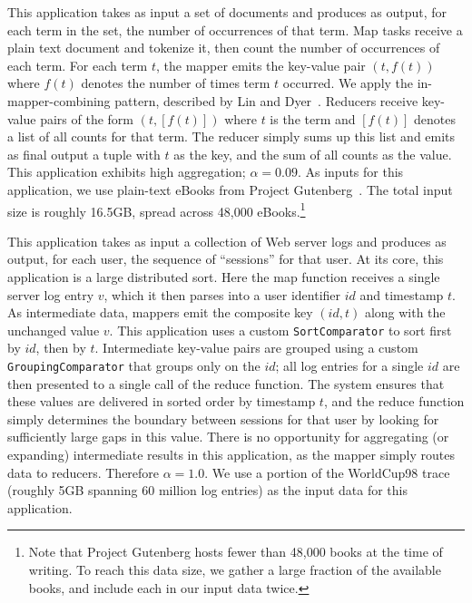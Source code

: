  This application takes as input a set of
documents and produces as output, for each term in the set, the number of
occurrences of that term.
Map tasks receive a plain text document and tokenize it, then count the number
of occurrences of each term.
For each term $t$, the mapper emits the key-value pair $(t, f(t))$ where $f(t)$
denotes the number of times term $t$ occurred.
We apply the in-mapper-combining pattern, described by Lin and
Dyer~\cite{lin2010ditp}.
Reducers receive key-value pairs of the form $(t, [f(t)])$ where $t$ is the
term and $[f(t)]$ denotes a list of all counts for that term.
The reducer simply sums up this list and emits as final output a tuple with $t$
as the key, and the sum of all counts as the value.
This application exhibits high aggregation; $\alpha=0.09$.
As inputs for this application, we use plain-text eBooks from Project
Gutenberg~\cite{gutenberg}.
The total input size is roughly 16.5\unit{GB}, spread across 48,000
eBooks.\footnote{Note that Project Gutenberg hosts fewer than 48,000 books at
the time of writing.  To reach this data size, we gather a large fraction of
the available books, and include each in our input data twice.}

 This application takes as input a collection
of Web server logs and produces as output, for each user, the sequence of
``sessions'' for that user.
At its core, this application is a large distributed sort.
Here the map function receives a single server log entry $v$, which it then
parses into a user identifier $id$ and timestamp $t$.
As intermediate data, mappers emit the composite key $(id, t)$ along with the
unchanged value $v$.
This application uses a custom \verb=SortComparator= to sort first by $id$,
then by $t$.
Intermediate key-value pairs are grouped using a custom
\verb=GroupingComparator= that groups only on the $id$; all log entries for a
single $id$ are then presented to a single call of the reduce function.
The system ensures that these values are delivered in sorted order by timestamp
$t$, and the reduce function simply determines the boundary between sessions
for that user by looking for sufficiently large gaps in this value.
There is no opportunity for aggregating (or expanding) intermediate results in
this application, as the mapper simply routes data to reducers.
Therefore $\alpha=1.0$.
We use a portion of the WorldCup98 trace~\cite{wc98} (roughly 5\unit{GB}
spanning 60 million log entries) as the input data for this application.

